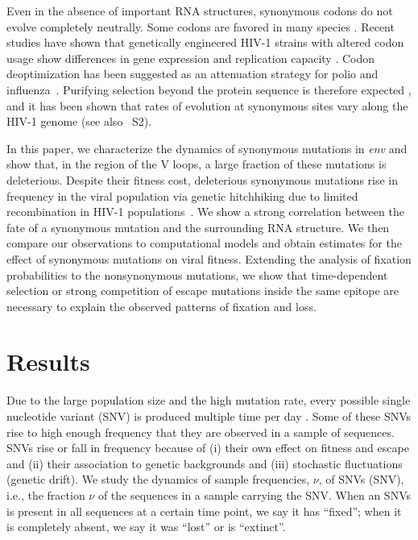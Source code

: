 \documentclass[rmp, twocolumn]{revtex4}
\newcommand{\env}{\textit{env}}
\newcommand{\syndiv}{2}
\begin{document}
Even in the absence of important RNA structures, synonymous codons do not evolve
completely neutrally. Some codons are favored in many species
\citep{plotkin_synonymous_2011}. Recent studies have shown that genetically
engineered HIV-1 strains with altered codon usage show differences in gene
expression and replication capacity \citep{ngumbela_quantitative_2008,
li_codon-usage-based_2012, keating_rich_2009}. Codon deoptimization has been
suggested as an attenuation strategy for polio and
influenza~\citep{mueller_live_2010,coleman_virus_2008}. Purifying selection
beyond the protein sequence is therefore expected
\citep{forsdyke_reciprocal_1995,snoeck_mapping_2011}, and it has been shown that
rates of evolution at synonymous sites vary along the HIV-1 genome
\citep{mayrose_towards_2007} (see also \figurename~S\syndiv).

In this paper, we characterize the dynamics of synonymous mutations in \env{}
and show that, in the region of the V loops, a large fraction of these mutations
is deleterious. Despite their fitness cost, deleterious synonymous mutations
rise in frequency in the viral population via genetic hitchhiking due to limited
recombination in HIV-1 populations~\citep{neher_recombination_2010,
batorsky_estimate_2011}. We show a strong correlation between the fate of a
synonymous mutation and the surrounding RNA structure. We then compare our
observations to computational models and obtain estimates for the effect of
synonymous mutations on viral fitness. Extending the analysis of fixation
probabilities to the nonsynonymous mutations, we show that time-dependent
selection or strong competition of escape mutations inside the same epitope are
necessary to explain the observed patterns of fixation and loss.

\section{Results}
Due to the large population size and the high mutation rate, every
possible single nucleotide variant (SNV) is produced multiple time per
day \citep{coffin_hiv_1995}. Some of these SNVs rise to high enough
frequency that they are observed in a sample of sequences. SNVs rise or fall in 
frequency because of (i) their own effect on fitness and escape and (ii)
their association to genetic backgrounds and (iii) stochastic fluctuations
(genetic drift). We study the dynamics of sample frequencies, $\nu$, of SNVs
(SNV), i.e., the fraction $\nu$ of the sequences in a sample carrying
the SNV. When an SNVs is present in all sequences 
at a certain time point, we say it has ``fixed''; when it is completely absent,
we say it was ``lost'' or is ``extinct''. 
\end{document}
